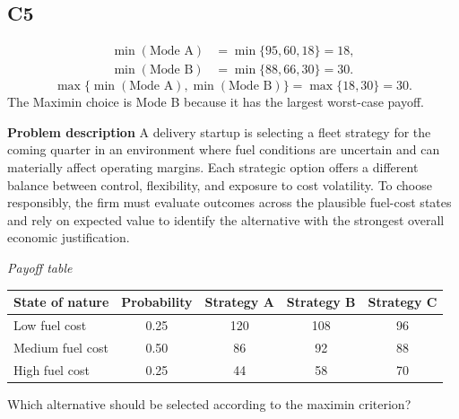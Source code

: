 \begin{ExamProblems}
		\subsection*{C5}
			\[
			\begin{aligned}
			\min(\text{Mode A}) &= \min\{95,60,18\} = 18,\\
			\min(\text{Mode B}) &= \min\{88,66,30\} = 30.
			\end{aligned}
			\]
			\[
			\max\{\min(\text{Mode A}), \min(\text{Mode B})\}
			= \max\{18, 30\}
			= 30.
			\]
			The Maximin choice is Mode B because it has the largest worst-case payoff.
		\item
		\textbf{Problem description}
		A delivery startup is selecting a fleet strategy for the coming quarter in an environment where fuel conditions are uncertain and can materially affect operating margins. Each strategic option offers a different balance between control, flexibility, and exposure to cost volatility. To choose responsibly, the firm must evaluate outcomes across the plausible fuel-cost states and rely on expected value to identify the alternative with the strongest overall economic justification.

		\begin{center}
			\textit{Payoff table} \par
			\begin{tabular}{l c c c c}
				\toprule
				State of nature & Probability & Strategy A & Strategy B & Strategy C \\
				\midrule
				Low fuel cost & 0.25 & 120 & 108 & 96 \\
				Medium fuel cost & 0.50 & 86 & 92 & 88 \\
				High fuel cost & 0.25 & 44 & 58 & 70 \\
				\bottomrule
			\end{tabular}
		\end{center}

		Which alternative should be selected according to the maximin criterion?


\end{ExamProblems}
